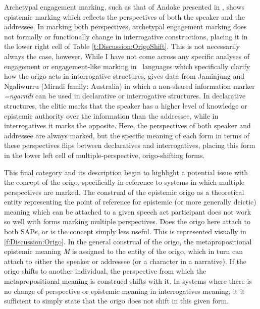 Archetypal engagement marking, such as that of Andoke presented in , shows epistemic marking which reflects the perspectives of both the speaker and the addressee. In marking both perspectives, archetypal engagement marking does not formally or functionally change in interrogative constructions, placing it in the lower right cell of Table \ref{t:Discussion:OrigoShift}. This is not necessarily always the case, however. While I have not come across any specific analyses of engagement or engagement-like marking in \lfam\ languages which specifically clarify how the origo acts in interrogative structures,  gives data from Jaminjung and Ngaliwurru (Mirndi family: Australia) in which a non-shared information marker \textit{=ngarndi} can be used in declarative or interrogative structures. In declarative structures, the clitic marks that the speaker has a higher level of knowledge or epistemic authority over the information than the addressee, while in interrogatives it marks the opposite. Here, the perspectives of both speaker and addressee are always marked, but the specific meaning of each form in terms of these perspectives flips between declaratives and interrogatives, placing this form in the lower left cell of multiple-perspective, origo-shifting forms.

This final category and its description begin to highlight a potential issue with the concept of the origo, specifically in reference to systems in which multiple perspectives are marked. The construal of the epistemic origo as a theoretical entity representing the point of reference for epistemic (or more generally deictic) meaning which can be attached to a given speech act participant does not work so well with forms marking multiple perspectives. Does the origo here attach to both SAPs, or is the concept simply less useful. This is represented visually in \ref{f:Discussion:Origo}. In the general construal of the origo, the metapropositional epistemic meaning \textit{M} is assigned to the entity of the origo, which in turn can attach to either the speaker or addressee (or a character in a narrative). If the origo shifts to another individual, the perspective from which the metapropositional meaning is construed shifts with it. In systems where there is no change of perspective or epistemic meaning in interrogatives meaning, it it sufficient to simply state that the origo does not shift in this given form.


